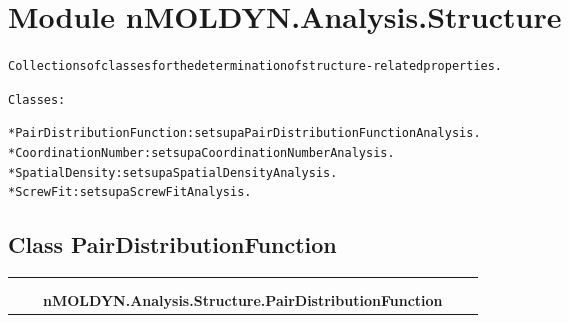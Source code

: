 %
%
%


\section{Module nMOLDYN.Analysis.Structure}

    \label{nMOLDYN:Analysis:Structure}
\begin{alltt}
Collections of classes for the determination of structure-related properties.

Classes:

    * PairDistributionFunction : sets up a Pair Distribution Function Analysis.
    * CoordinationNumber       : sets up a Coordination Number Analysis.
    * SpatialDensity           : sets up a Spatial Density Analysis.
    * ScrewFit                 : sets up a Screw Fit Analysis.
\end{alltt}



\subsection{Class PairDistributionFunction}

    \label{nMOLDYN:Analysis:Structure:PairDistributionFunction}
\begin{tabular}{cccccc}
\multicolumn{2}{r}{\settowidth{\BCL}{nMOLDYN.Analysis.Analysis.Analysis}\multirow{2}{\BCL}{nMOLDYN.Analysis.Analysis.Analysis}}
&&
  \\\cline{3-3}
  &&\multicolumn{1}{c|}{}
&&
  \\
&&\multicolumn{2}{l}{\textbf{nMOLDYN.Analysis.Structure.PairDistributionFunction}}
\end{tabular}

